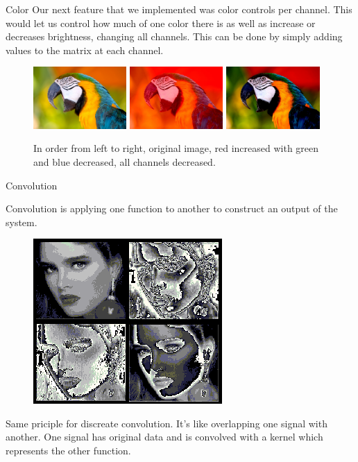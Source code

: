 \documentclass{beamer}
\begin{document}
\begin{frame}{Color}
Our next feature that we implemented was color controls per channel. This would let us control how much of one color there is as well as increase or decreases brightness, changing all channels. This can be done by simply adding values to the matrix at each channel.

\begin{figure}[ht]
\includegraphics[width=1.4in]{parrot.jpg}
\hspace{.1in} 
\includegraphics[width=1.4in]{parrotout1.jpg}
\hspace{.1in}
\includegraphics[width=1.4in]{parrotout2.jpg}
\hspace{.1in}
\caption{In order from left to right, original image, red increased with green and blue decreased, all channels decreased.}
\end{figure}
\end{frame}

\begin{frame}{Convolution}

Convolution is applying one function to another to construct an output of the system. 
\newline

\begin{figure}
\begin{center}
\includegraphics[width= 1.4 in]{convolution.png}
\end{center}
\end{figure}
Same priciple for discreate convolution. It's like overlapping one signal with another. One signal has original data and is convolved with a kernel which represents the other function. 


\end{frame}
\end{document}

